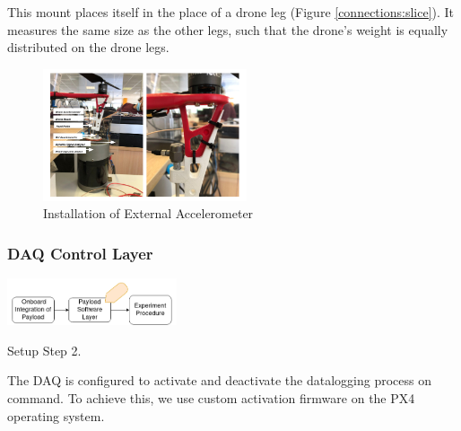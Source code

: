 This mount places itself in the place of a drone leg (Figure \ref{connections:slice}). It measures the same size as the other legs, such that the drone's weight is equally distributed on the drone legs.

\begin{figure}[!h]
    \raggedright
    \hspace{2cm}
    \includegraphics[width=6cm]{images/stage_graphs/vibration_results/vibration_test_drone.png}
    \hspace{2cm} \caption{Installation of External Accelerometer}
\end{figure}

\subsubsection{DAQ Control Layer}  

\begin{marginfigure}%
    \raggedright
    {\includegraphics[width=5cm]{images/stage_system/drone_setup/payload_onboard2.png}}
    \caption{Setup Step 2.}
    \label{fig:vibration_prep3}
\end{marginfigure}


The DAQ is configured to activate and deactivate the datalogging process on command. To achieve this, we use custom activation firmware on the PX4 operating system.  

